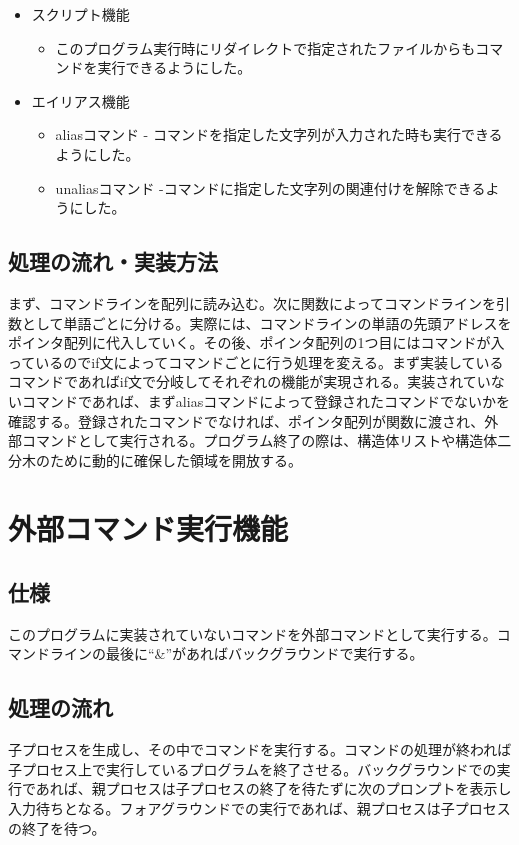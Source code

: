 \documentclass{procreport}
\begin{document}
\begin{itemize}
\item スクリプト機能
\begin{itemize}
\item このプログラム実行時にリダイレクトで指定されたファイルからもコマンドを実行できるようにした。
\end{itemize}
\item エイリアス機能
\begin{itemize}
\item aliasコマンド - コマンドを指定した文字列が入力された時も実行できるようにした。
\item unaliasコマンド -コマンドに指定した文字列の関連付けを解除できるようにした。
\end{itemize}
\end{itemize}

\subsection{処理の流れ・実装方法}
まず、コマンドラインを配列に読み込む。次に関数によってコマンドラインを引数として単語ごとに分ける。実際には、コマンドラインの単語の先頭アドレスをポインタ配列に代入していく。その後、ポインタ配列の1つ目にはコマンドが入っているのでif文によってコマンドごとに行う処理を変える。まず実装しているコマンドであればif文で分岐してそれぞれの機能が実現される。実装されていないコマンドであれば、まずaliasコマンドによって登録されたコマンドでないかを確認する。登録されたコマンドでなければ、ポインタ配列が関数に渡され、外部コマンドとして実行される。プログラム終了の際は、構造体リストや構造体二分木のために動的に確保した領域を開放する。



\section{外部コマンド実行機能}

\subsection{仕様}
このプログラムに実装されていないコマンドを外部コマンドとして実行する。コマンドラインの最後に``\&''があればバックグラウンドで実行する。

\subsection{処理の流れ}
子プロセスを生成し、その中でコマンドを実行する。コマンドの処理が終われば子プロセス上で実行しているプログラムを終了させる。バックグラウンドでの実行であれば、親プロセスは子プロセスの終了を待たずに次のプロンプトを表示し入力待ちとなる。フォアグラウンドでの実行であれば、親プロセスは子プロセスの終了を待つ。
\end{document}
